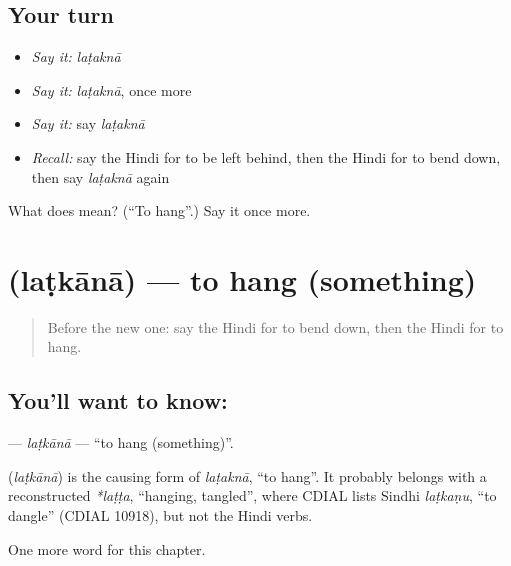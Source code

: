\subsection*{Your turn}
\begin{itemize}
\raggedright
  \item \emph{Say it:} \emph{laṭaknā}
  \item \emph{Say it:} \emph{laṭaknā}, once more
  \item \emph{Say it:} say \emph{laṭaknā}
  \item \emph{Recall:} say the Hindi for to be left behind, then the Hindi for to bend down, then say \emph{laṭaknā} again
\end{itemize}

\begin{tcolorbox}[breakable,colback=teal!4,colframe=teal!35!black,title={Before you move on}]
What does  mean? (\textquotedblleft{}To hang\textquotedblright{}.) Say it once more.
\end{tcolorbox}
\section[\texorpdfstring{\hi{लटकाना} (laṭkānā)}{लटकाना (laṭkānā)}]{ (laṭkānā) — to hang (something)}

\label{lesson:HI-C230-latkana}



\begin{quote}
Before the new one: say the Hindi for to bend down, then the Hindi for to hang.
\end{quote}

\subsection*{You'll want to know: }
\textbf{} — \emph{laṭkānā} — \textquotedblleft{}to hang (something)\textquotedblright{}.

\begin{cousinweb}
\textbf{} (\emph{laṭkānā}) is the causing form of \emph{laṭaknā}, \textquotedblleft{}to hang\textquotedblright{}. It probably belongs with a reconstructed \emph{*laṭṭa}, \textquotedblleft{}hanging, tangled\textquotedblright{}, where CDIAL lists Sindhi \emph{laṭkaṇu}, \textquotedblleft{}to dangle\textquotedblright{} (CDIAL 10918), but not the Hindi verbs.
\end{cousinweb}

\begin{grammarlens}[title={What you've built}]
One more word for this chapter.
\end{grammarlens}

